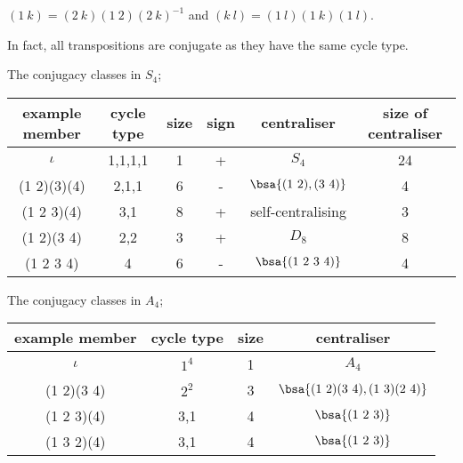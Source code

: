 \begin{example}
$(1\ k) = (2\ k)(1\ 2)(2\ k)^{-1}$ and $(k\ l) = (1\ l)(1\ k)(1\ l)$.

In fact, all transpositions are conjugate as they have the same cycle type.
\end{example}

\begin{example}
The conjugacy classes in $S_4$;

\begin{table}[h!]
\centering
\begin{tabular}{cccccc}
\hline
example member & cycle type & size & sign & centraliser & size of centraliser\\
\hline
$\iota$ & 1,1,1,1 & 1 & + & $S_4$ & 24\\
(1 2)(3)(4) & 2,1,1 & 6 & - & $\bsa{(1\ 2),(3\ 4)}$ & 4\\
(1 2 3)(4) & 3,1 & 8 & + & self-centralising & 3\\
(1 2)(3 4) & 2,2 & 3 & + & $D_8$ & 8\\
(1 2 3 4) & 4 & 6 & - & $\bsa{(1\ 2\ 3\ 4)}$ & 4\\
\hline
\end{tabular}
\end{table}
\end{example}


\begin{example}
The conjugacy classes in $A_4$;

\begin{table}[h!]
\centering
\begin{tabular}{cccc}
\hline
example member & cycle type & size & centraliser\\
\hline
$\iota$ & $1^4$ & 1 & $A_4$\\
(1 2)(3 4) & $2^2$ & 3 & $\bsa{(1\ 2)(3\ 4),(1\ 3)(2\ 4)}$\\
(1 2 3)(4) & 3,1 & 4 & $\bsa{(1\ 2\ 3)}$\\
(1 3 2)(4) & 3,1 & 4 & $\bsa{(1\ 2\ 3)}$\\
\hline
\end{tabular}
\end{table}
\end{example}


